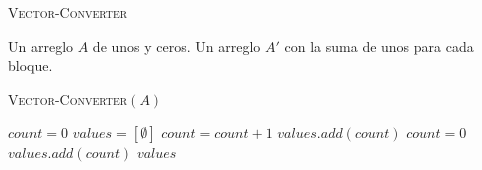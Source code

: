 \documentclass[conference]{IEEEtran}
\begin{document}
\newpage

\begin{algorithm}
\caption{\textsc{Vector-Converter}}
\scriptsize
\begin{algorithmic}
\REQUIRE Un arreglo $A$ de unos y ceros.
\ENSURE Un arreglo $A'$ con la suma de unos para cada bloque.
\begin{flushleft}
\textsc{Vector-Converter}$(A)$
\end{flushleft}
    \STATE $count=0$
    \STATE $values=[\emptyset]$
            \STATE $count=count+1$
        \ELSE
                \STATE $values.add(count)$
                \STATE $count=0$
            \ENDIF
        \ENDIF
    \ENDFOR
        \STATE $values.add(count)$
    \ENDIF
    \RETURN $values$
\end{algorithmic}
\label{alg:vector-converter}
\end{algorithm}
\end{document}
